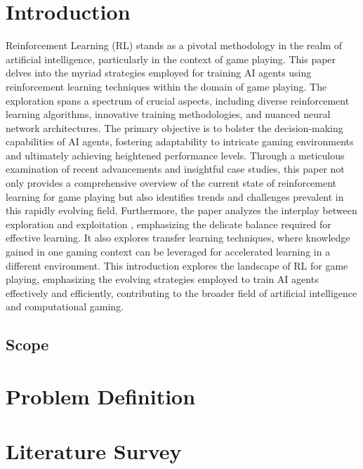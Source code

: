 \documentclass[ 12pt,a4paper,twocolumn,fleqn]{article}
\begin{document}
\section{Introduction}
Reinforcement Learning (RL) \cite{b1} stands as a pivotal methodology in the realm of artificial
intelligence, particularly in the context of game playing. This paper delves into the myriad
strategies employed for training AI agents using reinforcement learning techniques within the
domain of game playing. The exploration spans a spectrum of crucial aspects, including diverse reinforcement learning algorithms, innovative training methodologies, and nuanced neural network architectures. The primary objective is to bolster the decision-making capabilities of AI agents, fostering adaptability to intricate gaming environments and ultimately achieving heightened performance levels.
Through a meticulous examination of recent advancements and insightful case studies, this paper not only provides a comprehensive overview of the current state of reinforcement learning for game playing but also identifies trends and challenges prevalent in this rapidly evolving field.  Furthermore, the paper analyzes the interplay between exploration and exploitation \cite{b2}, emphasizing the delicate balance required for effective learning. It also explores transfer learning techniques, where knowledge gained in one gaming context can be leveraged for accelerated learning in a different environment.
This introduction explores the landscape of RL for game playing, emphasizing the evolving strategies employed to train AI agents effectively and efficiently, contributing to the broader field of artificial intelligence and computational gaming.

\subsection{Scope}

\clearpage

\newpage
 \pagestyle{fancy}
\thisfancypage{%
  \setlength{\fboxsep}{20pt}\doublebox}{}

\section{Problem Definition}

\clearpage

\newpage
 \pagestyle{fancy}
\thisfancypage{%
  \setlength{\fboxsep}{20pt}\doublebox}{}

\section{Literature Survey}
\end{document}
